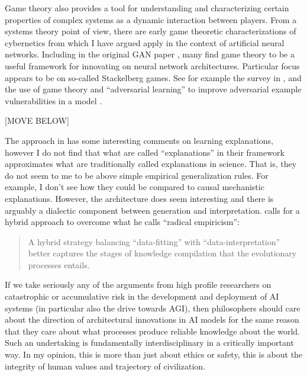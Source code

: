 \documentclass[11pt, oneside]{article}   	%
\begin{document}

Game theory also provides a tool for understanding and characterizing certain properties of complex systems as a dynamic interaction between players.  From a systems theory point of view, there are early game theoretic characterizations of cybernetics from \cite{Ashby1958} which I have argued apply in the context of artificial neural networks.  \citep{Beebe2021}  Including in the original GAN paper \citep{GANS2014}, many find game theory to be a useful framework for innovating on neural network architectures.  Particular focus appears to be on so-called Stackelberg games.  See for example the survey in \citep{GameTheoryDLSurvey2022}, and the use of game theory and ``adversarial learning'' to improve adversarial example vulnerabilities in a model \citep{AdversarialLearning2021}.   







[MOVE BELOW]


The approach in \citep{Norelli2022} has some interesting comments on learning explanations, however I do not find that what are called ``explanations'' in their framework approximates what are traditionally called explanations in science.  That is, they do not seem to me to be above simple empirical generalization rules.  For example, I don't see how they could be compared to causal mechanistic explanations.  However, the architecture does seem interesting and there is arguably a dialectic component between generation and interpretation. \citep{Pearl2021} calls for a hybrid approach to overcome what he calls ``radical empiricism'':

\begin{quote}
    A hybrid strategy balancing ``data-fitting'' with ``data-interpretation'' better captures the stages of knowledge compilation that the evolutionary processes entails. \citep[p. 80]{Pearl2021}
\end{quote}


If we take seriously any of the arguments from high profile researchers on catastrophic or accumulative risk in the development and deployment of AI systems (in particular also the drive towards AGI), then philosophers should care about the direction of architectural innovations in AI models for the same reason that they care about what processes produce reliable knowledge about the world.  Such an undertaking is fundamentally interdisciplinary in a critically important way.  In my opinion, this is more than just about ethics or safety, this is about the integrity of human values and trajectory of civilization.
\end{document}
